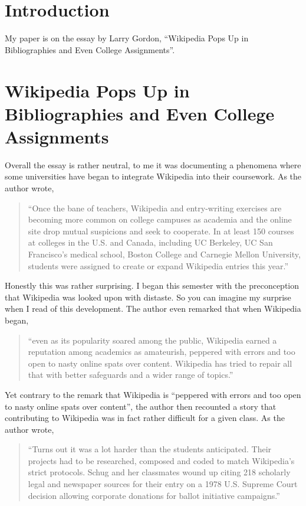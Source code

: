 \section*{Introduction}

My paper is on the essay by Larry Gordon, ``Wikipedia Pops Up in Bibliographies and Even College Assignments''.

\section*{Wikipedia Pops Up in Bibliographies and Even College Assignments}

Overall the essay is rather neutral, to me it was documenting a phenomena where some universities have began to integrate Wikipedia into their coursework. As the author wrote,

\begin{quotation}
``Once the bane of teachers, Wikipedia and entry-writing exercises are becoming more common on college campuses as academia and the online site drop mutual suspicions and seek to cooperate. In at least 150 courses at colleges in the U.S. and Canada, including UC Berkeley, UC San Francisco’s medical school, Boston College and Carnegie Mellon University, students were assigned to create or expand Wikipedia entries this year.''
\end{quotation}

Honestly this was rather surprising. I began this semester with the preconception that Wikipedia was looked upon with distaste. So you can imagine my surprise when I read of this development. The author even remarked that when Wikipedia began,

\begin{quotation}
“even as its popularity soared among the public, Wikipedia earned a reputation among academics as amateurish, peppered with errors and too open to nasty online spats over content. Wikipedia has tried to repair all that with better safeguards and a wider range of topics.”
\end{quotation}


Yet contrary to the remark that Wikipedia is “peppered with errors and too open to nasty online spats over content”, the author then recounted a story that contributing to Wikipedia was in fact rather difficult for a given class. As the author wrote,

\begin{quotation}
“Turns out it was a lot harder than the students anticipated. Their projects had to be researched, composed and coded to match Wikipedia’s strict protocols. Schug and her classmates wound up citing 218 scholarly legal and newspaper sources for their entry on a 1978 U.S. Supreme Court decision allowing corporate donations for ballot initiative campaigns.” 
\end{quotation}


